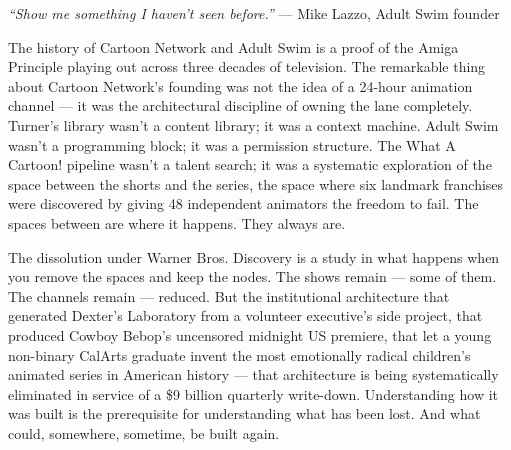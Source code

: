 \documentclass[11pt,letterpaper]{article}
\begin{document}
\begin{quotebox}
\textit{``Show me something I haven't seen before.''} --- Mike Lazzo, Adult Swim founder

The history of Cartoon Network and Adult Swim is a proof of the Amiga Principle playing out across three decades of television. The remarkable thing about Cartoon Network's founding was not the idea of a 24-hour animation channel --- it was the architectural discipline of owning the lane completely. Turner's library wasn't a content library; it was a context machine. Adult Swim wasn't a programming block; it was a permission structure. The What A Cartoon! pipeline wasn't a talent search; it was a systematic exploration of the space between the shorts and the series, the space where six landmark franchises were discovered by giving 48 independent animators the freedom to fail. The spaces between are where it happens. They always are.

The dissolution under Warner Bros. Discovery is a study in what happens when you remove the spaces and keep the nodes. The shows remain --- some of them. The channels remain --- reduced. But the institutional architecture that generated Dexter's Laboratory from a volunteer executive's side project, that produced Cowboy Bebop's uncensored midnight US premiere, that let a young non-binary CalArts graduate invent the most emotionally radical children's animated series in American history --- that architecture is being systematically eliminated in service of a \$9 billion quarterly write-down. Understanding how it was built is the prerequisite for understanding what has been lost. And what could, somewhere, sometime, be built again.
\end{quotebox}
\end{document}
